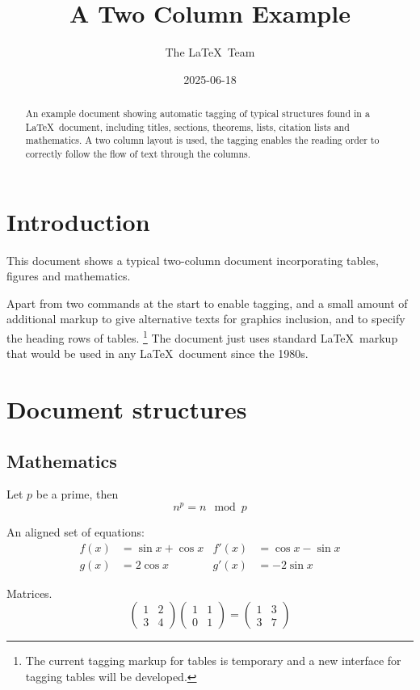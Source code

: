 \documentclass[a4paper,twocolumn]{article}
\begin{document}
\title{A Two Column Example}
\date{2025-06-18}
\author{The \LaTeX\ Team}

\pagestyle{headings}

\maketitle

\begin{abstract}
  An example document showing automatic tagging of typical structures
  found in a \LaTeX\ document, including titles, sections, theorems, lists,
  citation lists and mathematics. A two column layout is used, the
  tagging enables the reading order to correctly follow the flow of
  text through the columns.
\end{abstract}

\tableofcontents

\section{Introduction}

This document shows a typical two-column document incorporating tables, figures and mathematics.

Apart from two commands at the start to enable tagging, and a small
amount of additional markup to give alternative texts for graphics
inclusion, and to specify the heading rows of tables.%
\footnote{The current tagging markup for tables is temporary and a new interface
for tagging tables will be developed.} The document
just uses standard \LaTeX\ markup that would be used in any \LaTeX\
document since the 1980s.

\section{Document structures}

\subsection{Mathematics}

Let $p$ be a prime, then
\[n^p=n \mod p\]

An aligned set of equations:
\begin{align}
  f(x)&=\sin x + \cos x  & f'(x) &=\cos x - \sin x \\
  g(x)&=2\cos x          & g'(x) &= -2\sin x
\end{align}

Matrices.
\[
\begin{pmatrix}1&2\\3&4\end{pmatrix}
\begin{pmatrix}1&1\\0&1\end{pmatrix}
=
\begin{pmatrix}1&3\\3&7\end{pmatrix}
\]
\end{document}
